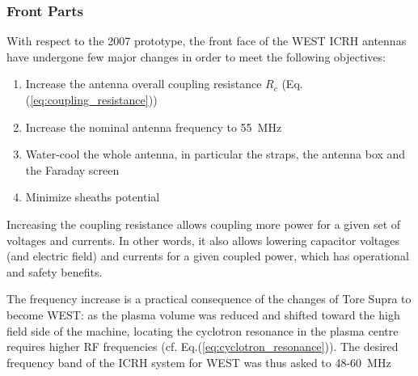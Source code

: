 \subsubsection{Front Parts}
With respect to the 2007 prototype, the front face of the WEST ICRH antennas have undergone few major changes in order to meet the following objectives:
\begin{enumerate}
	\item Increase the antenna overall coupling resistance $R_c$ (Eq.(\ref{eq:coupling_resistance}))
	\item Increase the nominal antenna frequency to 55~MHz
	\item Water-cool the whole antenna, in particular the straps, the antenna box and the Faraday screen
	\item Minimize sheaths potential
\end{enumerate}

Increasing the coupling resistance allows coupling more power for a given set of voltages and currents. In other words, it also allows lowering capacitor voltages (and electric field) and currents for a given coupled power, which has operational and safety benefits. 

The frequency increase is a practical consequence of the changes of Tore Supra to become WEST: as the plasma volume was reduced and  shifted toward the high field side of the machine, locating the cyclotron resonance in the plasma centre requires higher RF frequencies (cf. Eq.(\ref{eq:cyclotron_resonance})). The desired frequency band of the ICRH system for WEST was thus asked to 48-60~MHz 

